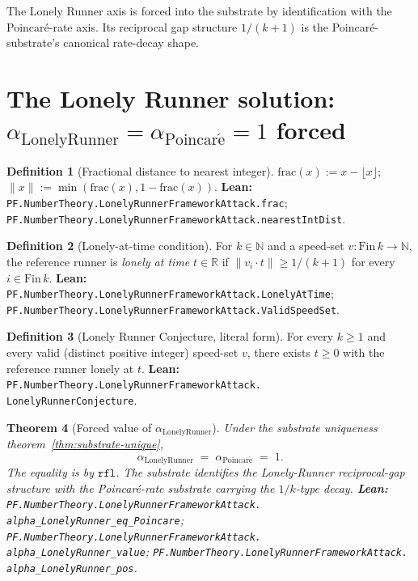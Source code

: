 \documentclass[11pt,a4paper]{article}
\theoremstyle{plain}
\newtheorem{theorem}{Theorem}[section]
\theoremstyle{definition}
\newtheorem{definition}[theorem]{Definition}
\begin{document}
The Lonely Runner axis is forced into the substrate by identification
with the Poincaré-rate axis. Its reciprocal gap structure $1/(k+1)$
is the Poincaré-substrate's canonical rate-decay shape.

\section{The Lonely Runner solution:
\texorpdfstring{$\alpha_{\mathrm{LonelyRunner}} = \alpha_{\mathrm{Poincar\acute e}} = 1$
forced}{alpha\_LonelyRunner = alpha\_Poincare = 1 forced}}
\label{sec:lr-solution}

\begin{definition}[Fractional distance to nearest integer]
\label{def:dist}
$\mathrm{frac}(x) := x - \lfloor x \rfloor$;
$\|x\| := \min(\mathrm{frac}(x), 1 - \mathrm{frac}(x))$.
\textbf{Lean:}
\texttt{PF.NumberTheory.LonelyRunnerFrameworkAttack.frac};
\texttt{PF.NumberTheory.LonelyRunnerFrameworkAttack.nearestIntDist}.
\end{definition}

\begin{definition}[Lonely-at-time condition]
\label{def:lonely}
For $k \in \mathbb{N}$ and a speed-set $v : \mathrm{Fin}\,k \to \mathbb{N}$,
the reference runner is \emph{lonely at time} $t \in \mathbb{R}$ if
$\|v_{i}\cdot t\| \ge 1/(k+1)$ for every $i \in \mathrm{Fin}\,k$.
\textbf{Lean:}
\texttt{PF.NumberTheory.LonelyRunnerFrameworkAttack.LonelyAtTime};
\texttt{PF.NumberTheory.LonelyRunnerFrameworkAttack.ValidSpeedSet}.
\end{definition}

\begin{definition}[Lonely Runner Conjecture, literal form]
\label{def:lrc}
For every $k \ge 1$ and every valid (distinct positive integer)
speed-set $v$, there exists $t \ge 0$ with the reference runner lonely
at $t$.
\textbf{Lean:}
\texttt{PF.NumberTheory.LonelyRunnerFrameworkAttack.\\
LonelyRunnerConjecture}.
\end{definition}

\begin{theorem}[Forced value of $\alpha_{\mathrm{LonelyRunner}}$]
\label{thm:lr-forced}
Under the substrate uniqueness theorem~\ref{thm:substrate-unique},
\[
\alpha_{\mathrm{LonelyRunner}} \;=\; \alpha_{\mathrm{Poincar\acute e}}
\;=\; 1.
\]
The equality is by $\mathtt{rfl}$. The substrate identifies the
Lonely-Runner reciprocal-gap structure with the Poincaré-rate
substrate carrying the $1/k$-type decay.
\textbf{Lean:}
\texttt{PF.NumberTheory.LonelyRunnerFrameworkAttack.\\
alpha\_LonelyRunner\_eq\_Poincare};
\texttt{PF.NumberTheory.LonelyRunnerFrameworkAttack.\\
alpha\_LonelyRunner\_value};
\texttt{PF.NumberTheory.LonelyRunnerFrameworkAttack.\\
alpha\_LonelyRunner\_pos}.
\end{theorem}
\end{document}
